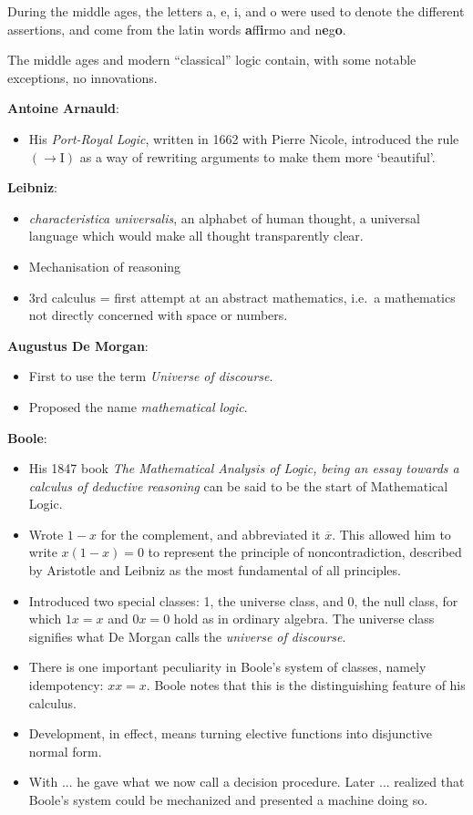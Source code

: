 \documentclass{article}
\begin{document}
During the middle ages, the letters a, e, i, and o were used to denote the
different assertions, and come from the latin words \textbf{a}ff\textbf{i}rmo
and n\textbf{e}g\textbf{o}.

The middle ages and modern ``classical'' logic contain, with some notable
exceptions, no innovations.

\textbf{Antoine Arnauld}:
\begin{itemize}
  \item His \textit{Port-Royal Logic}, written in 1662 with Pierre Nicole,
  introduced the rule \((\to\text{I})\) as a way of rewriting arguments to
  make them more `beautiful'.
\end{itemize}

\textbf{Leibniz}:
\begin{itemize}
  \item \textit{characteristica universalis}, an alphabet of human thought, a
  universal language which would make all thought transparently clear.
  \item Mechanisation of reasoning
  \item 3rd calculus = first attempt at an abstract mathematics, i.e.\ a
  mathematics not directly concerned with space or numbers.
\end{itemize}

\textbf{Augustus De Morgan}:
\begin{itemize}
  \item First to use the term \textit{Universe of discourse}.
  \item Proposed the name \textit{mathematical logic}.
\end{itemize}

\textbf{Boole}:
\begin{itemize}
  \item His 1847 book \textit{The Mathematical Analysis of Logic, being an
  essay towards a calculus of deductive reasoning} can be said to be the
  start of Mathematical Logic.
\item Wrote \(1-x\) for the complement, and abbreviated it \(\overline{x}\).
This allowed him to write \(x(1-x) = 0\) to represent the principle of
noncontradiction, described by Aristotle and Leibniz as the most fundamental
of all principles.
\item Introduced two special classes: 1, the universe class, and 0, the null class,
for which \(1x = x\) and \(0x = 0\) hold as in ordinary algebra. The universe
class signifies what De Morgan calls the \textit{universe of discourse}.
\item There is one important peculiarity in Boole's system of classes, namely idempotency: \(xx = x\).
Boole notes that this is the distinguishing feature of his calculus.
\item Development, in effect, means turning elective functions into
disjunctive normal form.
\item With ... he gave what we now call a decision procedure. Later ...
realized that Boole's system could be mechanized and presented a machine
doing so.
\end{itemize}
\end{document}
